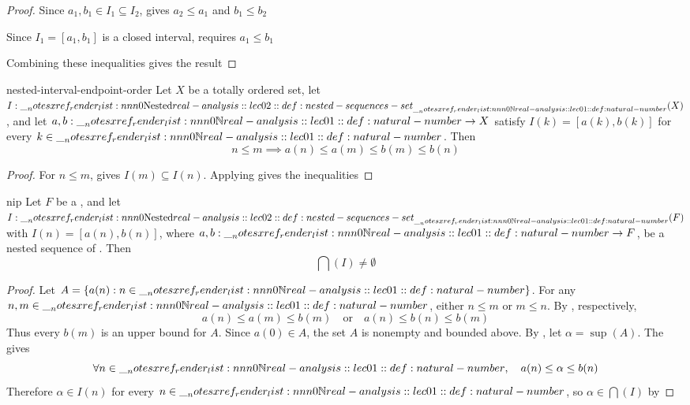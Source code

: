 \documentclass[12pt]{article}
\begin{document}
\begin{proof}
  Since \(a_1,b_1\in I_1\subseteq I_2\),
   gives \(a_2\le a_1\) and \(b_1\le b_2\)

  Since \(I_1=[a_1,b_1]\) is a closed interval,
   requires \(a_1\le b_1\)

  Combining these inequalities gives the result
\end{proof}

\begin{lem}{nested-interval-endpoint-order}
  Let \(X\) be a totally ordered set, let \(I:\Nested(X)\), and let
  \(a,b:\NN\to X\) satisfy \(I(k)=[a(k),b(k)]\) for every
  \(k\in\NN\). Then
  \[
    n\leq m
    \implies
    a(n)\leq a(m)\leq b(m)\leq b(n)
  \]
\end{lem}

\begin{proof}
  For \(n\leq m\), 
  gives \(I(m)\subseteq I(n)\). Applying
  gives the inequalities
\end{proof}

\begin{thm}{nip}
  Let \(F\) be a
  , and let
  \(I:\Nested(F)\) with \(I(n)=[a(n),b(n)]\), where
  \(a,b:\NN\to F\), be a nested sequence of
  . Then
  \[
    \bigcap(I)\neq\emptyset
  \]
\end{thm}

\begin{proof}
  Let \(A=\{a(n):n\in\NN\}\). For any \(n,m\in\NN\), either
  \(n\leq m\) or \(m\leq n\). By
  ,
  respectively,
  \[
    a(n)\leq a(m)\leq b(m)
    \quad\text{or}\quad
    a(n)\leq b(n)\leq b(m)
  \]
  Thus every \(b(m)\) is an upper bound for \(A\). Since
  \(a(0)\in A\), the set \(A\) is nonempty and bounded above.
  By , let
  \(\alpha=\sup(A)\). The
   gives
  \[
    \forall n\in\NN,\quad a(n)\leq\alpha\leq b(n)
  \]
  Therefore \(\alpha\in I(n)\) for every \(n\in\NN\), so
  \(\alpha\in\bigcap(I)\) by
\end{proof}
\end{document}
